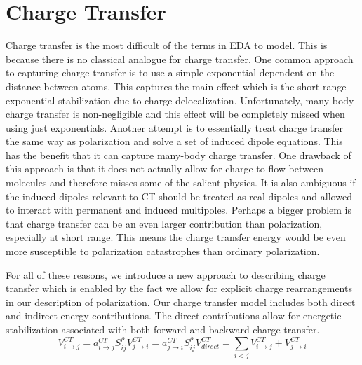 \documentclass[journal=jacsat,manuscript=article]{achemso}
\begin{document}
\section*{Charge Transfer}
Charge transfer is the most difficult of the terms in EDA to model. This is because there is no classical analogue for charge transfer. One common approach to capturing charge transfer is to use a simple exponential dependent on the distance between atoms.\cite{rackers2021polarizable} This captures the main effect which is the short-range exponential stabilization due to charge delocalization. Unfortunately, many-body charge transfer is non-negligible and this effect will be completely missed when using just exponentials. Another attempt is to essentially treat charge transfer the same way as polarization and solve a set of induced dipole equations.\cite{das2019development,wang2023general} This has the benefit that it can capture many-body charge transfer. One drawback of this approach is that it does not actually allow for charge to flow between molecules and therefore misses some of the salient physics. It is also ambiguous if the induced dipoles relevant to CT should be treated as real dipoles and allowed to interact  with permanent and induced multipoles. Perhaps a bigger problem is that charge transfer can be an even larger contribution than polarization, especially at short range. This means the charge transfer energy would be even more susceptible to polarization catastrophes than ordinary polarization.

For all of these reasons, we introduce a new approach to describing charge transfer which is enabled by the fact we allow for explicit charge rearrangements in our description of polarization. Our charge transfer model includes both direct and indirect energy contributions. The direct contributions allow for energetic stabilization associated with both forward and backward charge transfer.
\begin{subequations}
  \begin{equation}
  V^{CT}_{i\rightarrow j}=a_{i\rightarrow j}^{CT}S_{ij}^\rho
\end{equation}
\begin{equation}
  V^{CT}_{j\rightarrow i}=a_{j\rightarrow i}^{CT}S_{ij}^\rho
\end{equation}
\begin{equation}
  V^{CT}_{direct}=\sum_{i<j}V^{CT}_{i\rightarrow j}+V^{CT}_{j\rightarrow i}
\end{equation}
  \label{eq:ct_direct}
\end{subequations}
\end{document}
